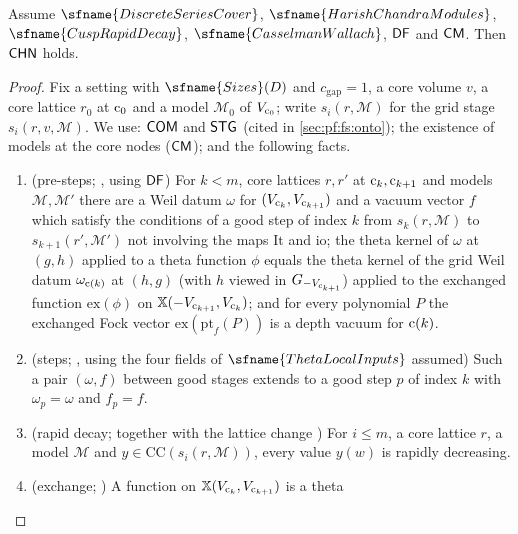 \begin{proposition}\label{pf:fs:chainEx}
Assume $\sfname{DiscreteSeriesCover}$, $\sfname{HarishChandraModules}$, $\sfname{CuspRapidDecay}$, $\sfname{CasselmanWallach}$, $\mathsf{DF}$
and $\mathsf{CM}$. Then $\mathsf{CHN}$ holds.
\end{proposition}

\begin{proof}
Fix a setting with $\sfname{Sizes}(D)$ and $c_{\mathrm{gap}}=1$, a core volume $v$, a core lattice $r_0$ at $\mathrm{c}_0$ and a model $\mathcal M_0$
of $V_{\mathrm{c}_0}$; write $s_i(r,\mathcal M)$ for the grid stage $s_i(r,v,\mathcal M)$. We use: $\mathsf{COM}$ and $\mathsf{STG}$ (cited in
\cref{sec:pf:fs:onto}); the existence of models at the core nodes ($\mathsf{CM}$); and the following facts.
\begin{enumerate}[label=(C\arabic*)]
\item (pre-steps; , using $\mathsf{DF}$) For $k<m$, core lattices $r,r'$ at
$\mathrm{c}_k,\mathrm{c}_{k+1}$ and models $\mathcal M,\mathcal M'$ there are a Weil datum $\omega$ for $(V_{\mathrm{c}_k},V_{\mathrm{c}_{k+1}})$ and a vacuum vector $f$
which satisfy the conditions of a good step of index $k$ from $s_k(r,\mathcal M)$ to $s_{k+1}(r',\mathcal M')$ not involving the maps
$\mathrm{It}$ and $\mathrm{io}$; the theta kernel of $\omega$ at $(g,h)$ applied to a theta function $\phi$ equals the theta kernel of the grid Weil
datum $\omega_{\mathrm{c}(k)}$ at $(h,g)$ (with $h$ viewed in $G_{-V_{\mathrm{c}_{k+1}}}$) applied to the exchanged function $\mathrm{ex}(\phi)$ on
$\mathbb X(-V_{\mathrm{c}_{k+1}},V_{\mathrm{c}_k})$; and for every polynomial $P$ the exchanged Fock vector $\mathrm{ex}(\mathrm{pt}_f(P))$ is a depth vacuum for
$\mathrm{c}(k)$.
\item (steps; , using the four fields of $\sfname{ThetaLocalInputs}$
assumed) Such a pair $(\omega,f)$ between good stages extends to a good step $p$ of index $k$ with $\omega_p=\omega$ and $f_p=f$.
\item (rapid decay;  together with the lattice change
) For $i\le m$, a core lattice $r$, a model $\mathcal M$ and
$y\in\mathrm{CC}(s_i(r,\mathcal M))$, every value $y(w)$ is rapidly decreasing.
\item (exchange; ) A function on $\mathbb X(V_{\mathrm{c}_k},V_{\mathrm{c}_{k+1}})$ is a theta

\end{enumerate}
\end{proof}

